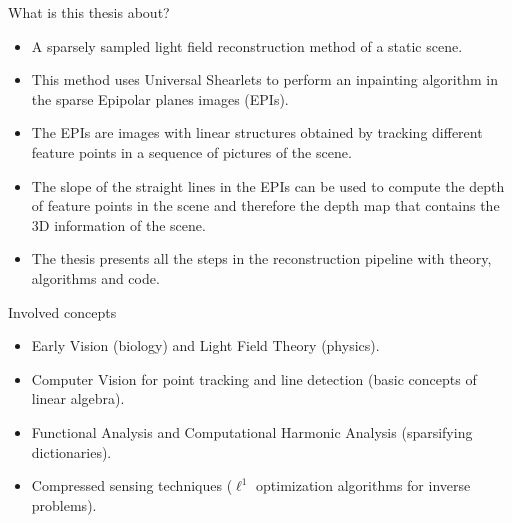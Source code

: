 
\begin{frame}{What is this thesis about?}
\begin{block}{}
\begin{itemize}
\item A sparsely sampled light field reconstruction method of a static scene. 

\bigskip
\pause
\item This method uses Universal Shearlets to perform an inpainting algorithm in the sparse Epipolar planes images (EPIs).

\bigskip 
\pause
\item The EPIs are images with linear structures obtained by tracking different feature points in a sequence of pictures of the scene. 

\bigskip
\pause
\item The slope of the straight lines in the EPIs can be used to compute the depth of feature points in the scene and therefore the depth map that contains the 3D information of the scene.

\bigskip
\pause
\item The thesis presents all the steps in the reconstruction pipeline with theory, algorithms and code. 
\end{itemize} 
\end{block}
\end{frame}

\begin{frame}{Involved concepts}
\begin{block}{}
\begin{itemize}
\item Early Vision (biology) and Light Field Theory (physics).

\bigskip
\pause
\item Computer Vision for point tracking and line detection (basic concepts of linear algebra).

\bigskip 
\pause
\item Functional Analysis and Computational Harmonic Analysis (sparsifying dictionaries).

\bigskip
\pause
\item Compressed sensing techniques ($\ell^1$ optimization algorithms for inverse problems). 
\end{itemize}
\end{block}
\end{frame}

